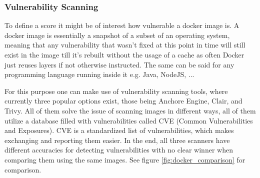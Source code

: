\subsubsection{Vulnerability Scanning}
To define a score it might be of interest how vulnerable a docker image is. A docker image is essentially a snapshot of a subset of an operating system, meaning that any vulnerability that wasn't fixed at this point in time will still exist in the image till it's rebuilt without the usage of a cache as often Docker just reuses layers if not otherwise instructed. The same can be said for any programming language running inside it e.g. Java, NodeJS, ...

For this purpose one can make use of vulnerability scanning tools, where currently three popular options exist, those being Anchore Engine, Clair, and Trivy.
All of them solve the issue of scanning images in different ways, all of them utilize a database filled with vulnerabilities called CVE (Common Vulnerabilities and Exposures). CVE is a standardized list of vulnerabilities, which makes exchanging and reporting them easier.
In the end, all three scanners have different accuracies for detecting vulnerabilities with no clear winner when comparing them using the same images. See figure \ref{fig:docker_comparison} for comparison.

